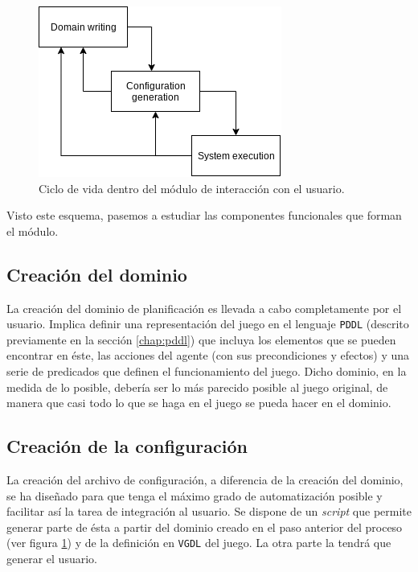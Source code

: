 \begin{figure}[H]
    \centering
    \includegraphics[scale=0.6]{img/CH05/iter_waterfall_model.png}
    \caption{Ciclo de vida dentro del módulo de interacción con el usuario.}
    \label{fig:iterative_waterfall_model}
\end{figure}

Visto este esquema, pasemos a estudiar las componentes funcionales que forman el módulo.

\subsection{Creación del dominio}

La creación del dominio de planificación es llevada a cabo completamente por el usuario.
Implica definir una representación del juego en el lenguaje \texttt{PDDL} (descrito previamente en la
sección \ref{chap:pddl}) que incluya los elementos que se pueden encontrar en éste, las acciones del agente
(con sus precondiciones y efectos) y una serie de predicados que definen el funcionamiento del juego.
Dicho dominio, en la medida de lo posible, debería ser lo más parecido posible al juego original,
de manera que casi todo lo que se haga en el juego se pueda hacer en el dominio.

\subsection{Creación de la configuración}

La creación del archivo de configuración, a diferencia de la creación del dominio, se ha diseñado para que
tenga el máximo grado de automatización posible y facilitar así la tarea de integración al usuario.
Se dispone de un \textit{script} que permite generar parte de ésta a partir del
dominio creado en el paso anterior del proceso (ver figura \ref{fig:iterative_waterfall_model}) y
de la definición en \texttt{VGDL} del juego. La otra parte la tendrá que generar el usuario.

